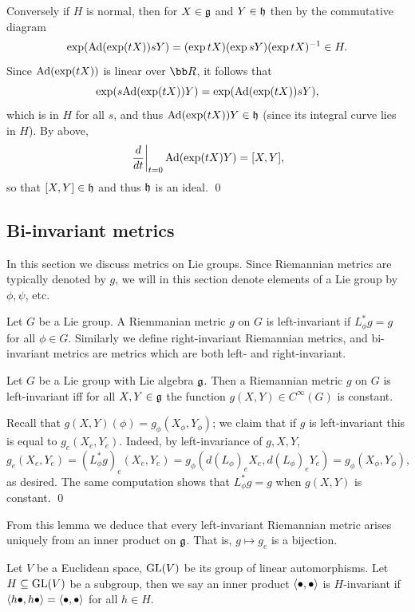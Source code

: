     Conversely if $H$ is normal, then for $X\in{{\frak g}}$ and $Y\in{{\frak h}}$ then by the commutative diagram
    $$ \exp({\rm Ad}(\exp(tX))sY) = (\exp tX)(\exp sY)(\exp tX)^{-1} \in H . $$
    Since ${\rm Ad}(\exp(tX))$ is linear over $\bR$, it follows that
    $$ \exp(s{\rm Ad}(\exp(tX))Y) = \exp({\rm Ad}(\exp(tX))sY) , $$
    which is in $H$ for all $s$, and thus ${\rm Ad}(\exp(tX))Y\in{{\frak h}}$ (since its integral curve lies in $H$).
    By above,
    $$ \left.{{d}\over{dt}}\right|_{t=0}{\rm Ad}(\exp(tX)Y) = [X,Y], $$
    so that $[X,Y]\in{{\frak h}}$ and thus ${{\frak h}}$ is an ideal.
    \qed

\eproof

\subsection{Bi-invariant metrics}

In this section we discuss metrics on Lie groups.
Since Riemannian metrics are typically denoted by $g$, we will in this section denote elements of a Lie group by $\phi,\psi$, etc.

\bdefn

    Let $G$ be a Lie group.
    A Riemmanian metric $g$ on $G$ is {\emphcolor left-invariant} if $L_\phi^*g=g$ for all $\phi\in G$.
    Similarly we define {\emphcolor right-invariant} Riemannian metrics, and {\emphcolor bi-invariant metrics} are metrics which are both
    left- and right-invariant.

\edefn

\blemm

    Let $G$ be a Lie group with Lie algebra ${{\frak g}}$.
    Then a Riemannian metric $g$ on $G$ is left-invariant iff for all $X,Y\in{{\frak g}}$ the function $g(X,Y)\in C^\infty(G)$ is constant.

\elemm

\bproof

    Recall that $g(X,Y)(\phi)=g_\phi(X_\phi,Y_\phi)$; we claim that if $g$ is left-invariant this is equal to $g_e(X_e,Y_e)$.
    Indeed, by left-invariance of $g,X,Y$,
    $$ g_e(X_e,Y_e) = (L_\phi^*g)_e(X_e,Y_e) = g_\phi(d(L_\phi)_eX_e,d(L_\phi)_eY_e) = g_\phi(X_\phi,Y_\phi), $$
    as desired.
    The same computation shows that $L_\phi^*g=g$ when $g(X,Y)$ is constant.
    \qed

\eproof

From this lemma we deduce that every left-invariant Riemannian metric arises uniquely from an inner product on ${{\frak g}}$.
That is, $g\mapsto g_e$ is a bijection.

\bdefn

    Let $V$ be a Euclidean space, ${\rm GL}(V)$ be its group of linear automorphisms.
    Let $H\subseteq{\rm GL}(V)$ be a subgroup, then we say an inner product $\mathopen{}\mathclose{\left<\bullet,\bullet\right>}$ is {\emphcolor $H$-invariant} if
    $\mathopen{}\mathclose{\left<h\bullet,h\bullet\right>}=\mathopen{}\mathclose{\left<\bullet,\bullet\right>}$ for all $h\in H$.

